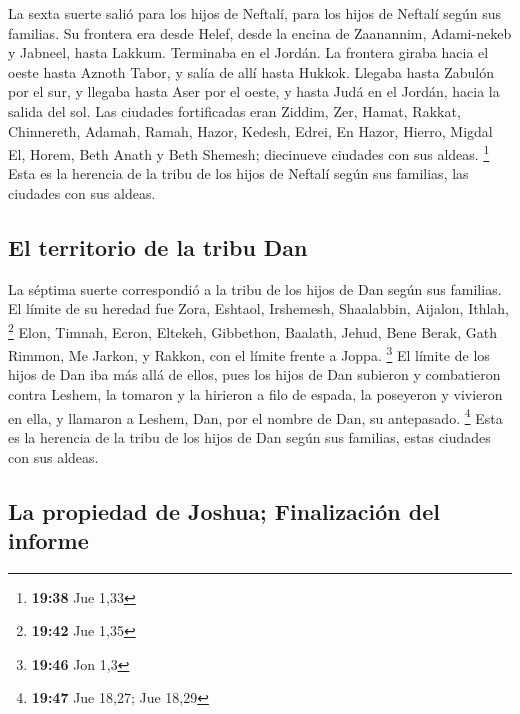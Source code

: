 La sexta suerte salió para los hijos de Neftalí, para
los hijos de Neftalí según sus familias.  Su frontera era
desde Helef, desde la encina de Zaanannim, Adami-nekeb y Jabneel, hasta
Lakkum. Terminaba en el Jordán.  La frontera giraba hacia
el oeste hasta Aznoth Tabor, y salía de allí hasta Hukkok. Llegaba hasta
Zabulón por el sur, y llegaba hasta Aser por el oeste, y hasta Judá en
el Jordán, hacia la salida del sol.  Las ciudades
fortificadas eran Ziddim, Zer, Hamat, Rakkat, Chinnereth,
 Adamah, Ramah, Hazor,  Kedesh, Edrei, En
Hazor,  Hierro, Migdal El, Horem, Beth Anath y Beth
Shemesh; diecinueve ciudades con sus aldeas. \footnote{\textbf{19:38}
  Jue 1,33}  Esta es la herencia de la tribu de los hijos
de Neftalí según sus familias, las ciudades con sus aldeas.

\hypertarget{el-territorio-de-la-tribu-dan}{%
\subsection{El territorio de la tribu
Dan}\label{el-territorio-de-la-tribu-dan}}

 La séptima suerte correspondió a la tribu de los hijos
de Dan según sus familias.  El límite de su heredad fue
Zora, Eshtaol, Irshemesh,  Shaalabbin, Aijalon, Ithlah,
\footnote{\textbf{19:42} Jue 1,35}  Elon, Timnah, Ecron,
 Eltekeh, Gibbethon, Baalath,  Jehud, Bene
Berak, Gath Rimmon,  Me Jarkon, y Rakkon, con el límite
frente a Joppa. \footnote{\textbf{19:46} Jon 1,3}  El
límite de los hijos de Dan iba más allá de ellos, pues los hijos de Dan
subieron y combatieron contra Leshem, la tomaron y la hirieron a filo de
espada, la poseyeron y vivieron en ella, y llamaron a Leshem, Dan, por
el nombre de Dan, su antepasado. \footnote{\textbf{19:47} Jue 18,27; Jue
  18,29}  Esta es la herencia de la tribu de los hijos de
Dan según sus familias, estas ciudades con sus aldeas.

\hypertarget{la-propiedad-de-joshua-finalizaciuxf3n-del-informe}{%
\subsection{La propiedad de Joshua; Finalización del
informe}\label{la-propiedad-de-joshua-finalizaciuxf3n-del-informe}}


